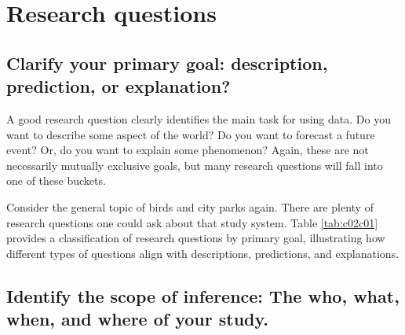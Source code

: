 \documentclass[
]{book}
\begin{document}
\section{Research questions}\label{research-questions}

\subsection{Clarify your primary goal: description, prediction, or explanation?}\label{clarify-your-primary-goal-description-prediction-or-explanation}

A good research question clearly identifies the main task for using data. Do you want to describe some aspect of the world? Do you want to forecast a future event? Or, do you want to explain some phenomenon? Again, these are not necessarily mutually exclusive goals, but many research questions will fall into one of these buckets.

Consider the general topic of birds and city parks again. There are plenty of research questions one could ask about that study system. Table \ref{tab:c02c01} provides a classification of research questions by primary goal, illustrating how different types of questions align with descriptions, predictions, and explanations.

\begin{table}[!h]
\centering\centering
\caption{\label{tab:c02c01}\label{tab:c02c01} Examples of description, prediction, and explanation questions.}
\centering
{}
\end{table}

\subsection{Identify the scope of inference: The who, what, when, and where of your study.}\label{identify-the-scope-of-inference-the-who-what-when-and-where-of-your-study.}
\end{document}

